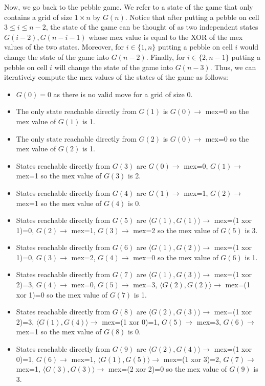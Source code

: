 \begin{solution}
Now, we go back to the pebble game. We refer to a state of the game that only contains a grid of size $1 \times n$ by $G(n)$. Notice that after putting a pebble on cell $3 \leq i \leq n-2$, the state of the game can be thought of as two independent states $G(i-2), G(n-i-1)$ whose mex value is equal to the XOR of the mex values of the two states. Moreover, for $i \in \{1,n\}$ putting a pebble on cell $i$ would change the state of the game into $G(n-2)$. Finally, for $i \in \{2,n-1\}$ putting a pebble on cell $i$ will change the state of the game into $G(n-3)$. Thus, we can iteratively compute the mex values of the states of the game as follows:
\begin{itemize}
	\item $G(0) = 0$ as there is no valid move for a grid of size $0$.
\item The only state reachable directly from $G(1)$ is $G(0) \rightarrow$ mex=0  so the mex value of $G(1)$ is 1.
\item The only state reachable directly from $G(2)$ is $G(0) \rightarrow$ mex=0  so the mex value of $G(2)$ is 1.
\item States reachable directly from $G(3)$ are $G(0) \rightarrow$ mex=0, $G(1) \rightarrow$ mex=1  so the mex value of $G(3)$ is 2.
\item States reachable directly from $G(4)$ are $G(1) \rightarrow$ mex=1, $G(2) \rightarrow$ mex=1  so the mex value of $G(4)$ is 0.
\item States reachable directly from $G(5)$ are $\langle G(1), G(1) \rangle \rightarrow$ mex=(1 xor 1)=0, $G(2) \rightarrow$ mex=1, $G(3) \rightarrow$ mex=2  so the mex value of $G(5)$ is 3.
\item States reachable directly from $G(6)$ are $\langle G(1), G(2) \rangle \rightarrow$ mex=(1 xor 1)=0, $G(3) \rightarrow$ mex=2, $G(4) \rightarrow$ mex=0  so the mex value of $G(6)$ is 1.
\item States reachable directly from $G(7)$ are $\langle G(1), G(3) \rangle \rightarrow$ mex=(1 xor 2)=3, $G(4) \rightarrow$ mex=0, $G(5) \rightarrow$ mex=3, $\langle G(2), G(2) \rangle \rightarrow$ mex=(1 xor 1)=0  so the mex value of $G(7)$ is 1.
\item States reachable directly from $G(8)$ are $\langle G(2), G(3) \rangle \rightarrow$ mex=(1 xor 2)=3, $\langle G(1), G(4) \rangle \rightarrow$ mex=(1 xor 0)=1, $G(5) \rightarrow$ mex=3, $G(6) \rightarrow$ mex=1  so the mex value of $G(8)$ is 0.
\item States reachable directly from $G(9)$ are $\langle G(2), G(4) \rangle \rightarrow$ mex=(1 xor 0)=1, $G(6) \rightarrow$ mex=1, $\langle G(1), G(5) \rangle \rightarrow$ mex=(1 xor 3)=2, $G(7) \rightarrow$ mex=1, $\langle G(3), G(3) \rangle \rightarrow$ mex=(2 xor 2)=0  so the mex value of $G(9)$ is 3.

\end{itemize}
\end{solution}
